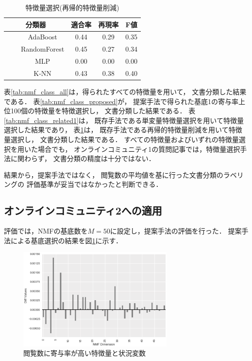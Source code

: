 \documentclass[12pt,a4paper,twocolumn,twoside]{jsik}
\begin{document}
\begin{table}[htb]
  \caption{特徴量選択(再帰的特徴量削減)} 
  \label{tab:nmf_class_related2}
  \begin{center}
  \begin{tabular}{c|c|c|c} \hline
    分類器 & 適合率 & 再現率 & F値 \\ \hline \hline
　　AdaBoost & 0.44 & 0.29 & 0.35 \\ \hline
　　RandomForest & 0.45 & 0.27 & 0.34 \\ \hline
　　MLP & 0.00 & 0.00 & 0.00 \\ \hline
　　K-NN & 0.43 & 0.38 & 0.40 \\ \hline
  \end{tabular}
  \end{center}
\end{table}

表\ref{tab:nmf_class_all}は，得られたすべての特徴量を用いて，
文書分類した結果である．
%
表\ref{tab:nmf_class_proposed}が，
提案手法で得られた基底1の寄与率上位100個の特徴量を特徴選択し，
文書分類した結果である．
%
表\ref{tab:nmf_class_related1}は，
既存手法である単変量特徴量選択を用いて特徴量選択した結果であり，
%
表\ref{tab:nmf_class_related2}は，
既存手法である再帰的特徴量削減を用いて特徴量選択し，
文書分類した結果である．
%
すべての特徴量およびいずれの特徴量選択を用いた場合でも，
オンラインコミュニティ1の質問記事では，特徴量選択手法に関わらず，
文書分類の精度は十分ではない．

結果から，提案手法ではなく，
閲覧数の平均値を基に行った文書分類のラベリングの
評価基準が妥当ではなかったと判断できる．

\subsection{オンラインコミュニティ2への適用}\label{result_3}
評価では，NMFの基底数を$M=50$に設定し，提案手法の評価を行った．
提案手法による基底選択の結果を図\ref{fig:graf_factor}に示す．
%
\begin{figure}[htb]
  \begin{center}
    \includegraphics[width=7.8cm]{./eps/u_histgram_diff_stackoverflow.eps}
    \caption{閲覧数に寄与率が高い特徴量と状況変数}
    \label{fig:graf_factor}
  \end{center}
\end{figure}
\end{document}
